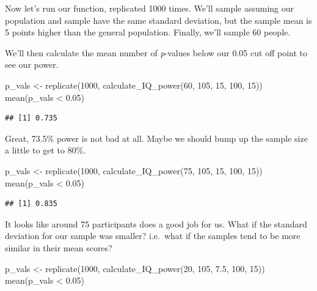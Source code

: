 \documentclass[
]{book}
\newenvironment{Shaded}{\begin{snugshade}}{\end{snugshade}}
\newcommand{\DecValTok}[1]{\textcolor[rgb]{0.00,0.00,0.81}{#1}}
\newcommand{\FloatTok}[1]{\textcolor[rgb]{0.00,0.00,0.81}{#1}}
\newcommand{\FunctionTok}[1]{\textcolor[rgb]{0.00,0.00,0.00}{#1}}
\newcommand{\NormalTok}[1]{#1}
\newcommand{\OtherTok}[1]{\textcolor[rgb]{0.56,0.35,0.01}{#1}}
\newcommand{\SpecialCharTok}[1]{\textcolor[rgb]{0.00,0.00,0.00}{#1}}
\begin{document}
Now let's run our function, replicated 1000 times. We'll sample assuming our population and sample have the same standard deviation, but the sample mean is 5 points higher than the general population. Finally, we'll sample 60 people.

We'll then calculate the mean number of \emph{p}-values below our 0.05 cut off point to see our power.

\begin{Shaded}
\begin{Highlighting}[]
\NormalTok{p\_vals }\OtherTok{\textless{}{-}} \FunctionTok{replicate}\NormalTok{(}\DecValTok{1000}\NormalTok{, }\FunctionTok{calculate\_IQ\_power}\NormalTok{(}\DecValTok{60}\NormalTok{, }\DecValTok{105}\NormalTok{, }\DecValTok{15}\NormalTok{, }\DecValTok{100}\NormalTok{, }\DecValTok{15}\NormalTok{))}
\FunctionTok{mean}\NormalTok{(p\_vals }\SpecialCharTok{\textless{}} \FloatTok{0.05}\NormalTok{)}
\end{Highlighting}
\end{Shaded}

\begin{verbatim}
## [1] 0.735
\end{verbatim}

Great, 73.5\% power is not bad at all. Maybe we should bump up the sample size a little to get to 80\%.

\begin{Shaded}
\begin{Highlighting}[]
\NormalTok{p\_vals }\OtherTok{\textless{}{-}} \FunctionTok{replicate}\NormalTok{(}\DecValTok{1000}\NormalTok{, }\FunctionTok{calculate\_IQ\_power}\NormalTok{(}\DecValTok{75}\NormalTok{, }\DecValTok{105}\NormalTok{, }\DecValTok{15}\NormalTok{, }\DecValTok{100}\NormalTok{, }\DecValTok{15}\NormalTok{))}
\FunctionTok{mean}\NormalTok{(p\_vals }\SpecialCharTok{\textless{}} \FloatTok{0.05}\NormalTok{)}
\end{Highlighting}
\end{Shaded}

\begin{verbatim}
## [1] 0.835
\end{verbatim}

It looks like around 75 participants does a good job for us. What if the standard deviation for our sample was smaller? i.e.~what if the samples tend to be more similar in their mean scores?

\begin{Shaded}
\begin{Highlighting}[]
\NormalTok{p\_vals }\OtherTok{\textless{}{-}} \FunctionTok{replicate}\NormalTok{(}\DecValTok{1000}\NormalTok{, }\FunctionTok{calculate\_IQ\_power}\NormalTok{(}\DecValTok{20}\NormalTok{, }\DecValTok{105}\NormalTok{, }\FloatTok{7.5}\NormalTok{, }\DecValTok{100}\NormalTok{, }\DecValTok{15}\NormalTok{))}
\FunctionTok{mean}\NormalTok{(p\_vals }\SpecialCharTok{\textless{}} \FloatTok{0.05}\NormalTok{)}
\end{Highlighting}
\end{Shaded}
\end{document}
